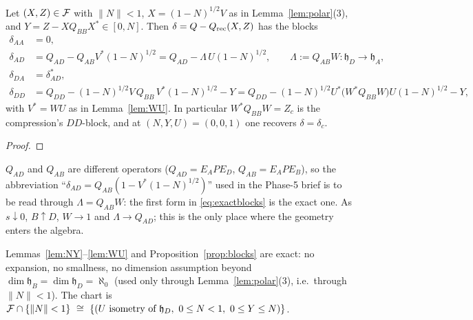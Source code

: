 \documentclass[11pt]{article}
\newcommand{\hh}{\mathfrak h}
\begin{document}
\begin{proposition}\label{prop:blocks}
Let $(X,Z)\in\mathcal F$ with $\|N\|<1$, $X=(1-N)^{1/2}V$ as in Lemma~\ref{lem:polar}(3), and
$Y=Z-XQ_{BB}X^*\in[0,N]$.  Then $\delta=Q-Q_{\rm rec}(X,Z)$ has the blocks
\begin{equation}\label{eq:exactblocks}
\begin{aligned}
 \delta_{AA}&=0,\\
 \delta_{AD}&=Q_{AD}-Q_{AB}V^*(1-N)^{1/2}
  =Q_{AD}-\Lambda\,U(1-N)^{1/2},\qquad \Lambda:=Q_{AB}W:\hh_D\to\hh_A,\\
 \delta_{DA}&=\delta_{AD}^*,\\
 \delta_{DD}&=Q_{DD}-(1-N)^{1/2}V\,Q_{BB}\,V^*(1-N)^{1/2}-Y
  =Q_{DD}-(1-N)^{1/2}U^*\!\bigl(W^*Q_{BB}W\bigr)U(1-N)^{1/2}-Y ,
\end{aligned}
\end{equation}
with $V^*=WU$ as in Lemma~\ref{lem:WU}.  In particular $W^*Q_{BB}W=Z_c$ is the
compression's $DD$-block, and at $(N,Y,U)=(0,0,1)$ one recovers $\delta=\delta_c$.
\end{proposition}
\begin{proof}
\lby{\eqref{eq:F}}
\end{proof}

\begin{remark}\label{rem:read}
$Q_{AD}$ and $Q_{AB}$ are different operators ($Q_{AD}=E_APE_D$, $Q_{AB}=E_APE_B$), so
the abbreviation ``$\delta_{AD}=Q_{AB}(1-V^*(1-N)^{1/2})$'' used in the Phase-5 brief is to
be read through $\Lambda=Q_{AB}W$: the first form in \eqref{eq:exactblocks} is the exact
one.  As $s\downarrow0$, $B\uparrow D$, $W\to1$ and $\Lambda\to Q_{AD}$; this is the only
place where the geometry enters the algebra.
\end{remark}

\begin{verdictok}[\;\S\ref{sec:param}]
Lemmas~\ref{lem:NY}--\ref{lem:WU} and Proposition~\ref{prop:blocks} are exact: no
expansion, no smallness, no dimension assumption beyond
$\dim\hh_B=\dim\hh_D=\aleph_0$ (used only through Lemma~\ref{lem:polar}(3), i.e.\ through
$\|N\|<1$).  The chart is
$\cF\cap\{\|N\|<1\}\ \cong\ \{(U\ \text{isometry of }\hh_D,\ 0\le N<1,\ 0\le Y\le N)\}$.
\end{verdictok}
\end{document}
